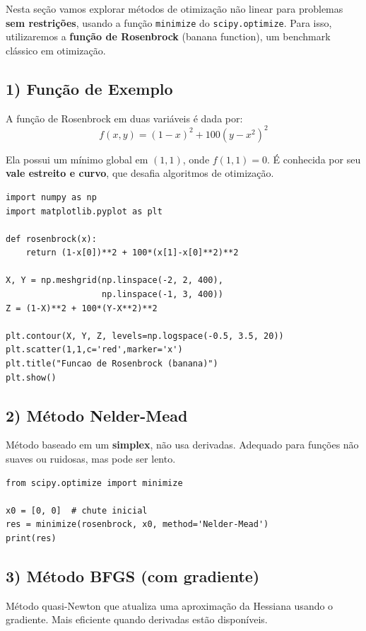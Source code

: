 \documentclass[9pt,a4paper]{extarticle}
\begin{document}
Nesta seção vamos explorar métodos de otimização não linear para problemas \textbf{sem restrições}, usando a função \texttt{minimize} do \texttt{scipy.optimize}. Para isso, utilizaremos a \textbf{função de Rosenbrock} (banana function), um benchmark clássico em otimização.

\subsection*{1) Função de Exemplo}

A função de Rosenbrock em duas variáveis é dada por:
\[
f(x,y) = (1-x)^2 + 100(y-x^2)^2
\]

Ela possui um mínimo global em $(1,1)$, onde $f(1,1)=0$. É conhecida por seu \textbf{vale estreito e curvo}, que desafia algoritmos de otimização.

\begin{lstlisting}
import numpy as np
import matplotlib.pyplot as plt

def rosenbrock(x):
    return (1-x[0])**2 + 100*(x[1]-x[0]**2)**2

X, Y = np.meshgrid(np.linspace(-2, 2, 400),
                   np.linspace(-1, 3, 400))
Z = (1-X)**2 + 100*(Y-X**2)**2

plt.contour(X, Y, Z, levels=np.logspace(-0.5, 3.5, 20))
plt.scatter(1,1,c='red',marker='x')
plt.title("Funcao de Rosenbrock (banana)")
plt.show()
\end{lstlisting}

\subsection*{2) Método Nelder-Mead}

Método baseado em um \textbf{simplex}, não usa derivadas. Adequado para funções não suaves ou ruidosas, mas pode ser lento.

\begin{lstlisting}
from scipy.optimize import minimize

x0 = [0, 0]  # chute inicial
res = minimize(rosenbrock, x0, method='Nelder-Mead')
print(res)
\end{lstlisting}

\subsection*{3) Método BFGS (com gradiente)}

Método quasi-Newton que atualiza uma aproximação da Hessiana usando o gradiente.  
Mais eficiente quando derivadas estão disponíveis.
\end{document}
